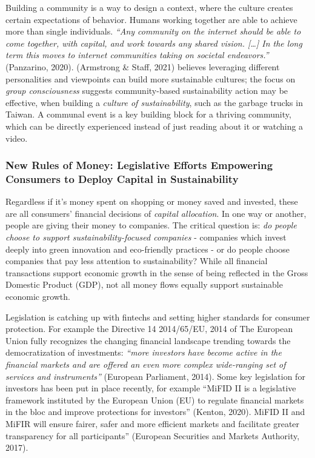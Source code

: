\documentclass[
  12pt,
  letterpaper,
  DIV=11,
  numbers=noendperiod]{scrartcl}
\begin{document}
Building a community is a way to design a context, where the culture
creates certain expectations of behavior. Humans working together are
able to achieve more than single individuals. \emph{``Any community on
the internet should be able to come together, with capital, and work
towards any shared vision. {[}\ldots{]} In the long term this moves to
internet communities taking on societal endeavors.''} (Panzarino, 2020).
(Armstrong \& Staff, 2021) believes leveraging different personalities
and viewpoints can build more sustainable cultures; the focus on
\emph{group consciousness} suggests community-based sustainability
action may be effective, when building a \emph{culture of
sustainability}, such as the garbage trucks in Taiwan. A communal event
is a key building block for a thriving community, which can be directly
experienced instead of just reading about it or watching a video.

\subsubsection{New Rules of Money: Legislative Efforts Empowering
Consumers to Deploy Capital in
Sustainability}\label{new-rules-of-money-legislative-efforts-empowering-consumers-to-deploy-capital-in-sustainability}

Regardless if it's money spent on shopping or money saved and invested,
these are all consumers' financial decisions of \emph{capital
allocation}. In one way or another, people are giving their money to
companies. The critical question is: \emph{do people choose to support
sustainability-focused companies} - companies which invest deeply into
green innovation and eco-friendly practices - or do people choose
companies that pay less attention to sustainability? While all financial
transactions support economic growth in the sense of being reflected in
the Gross Domestic Product (GDP), not all money flows equally support
sustainable economic growth.

Legislation is catching up with fintechs and setting higher standards
for consumer protection. For example the Directive 14 2014/65/EU, 2014
of The European Union fully recognizes the changing financial landscape
trending towards the democratization of investments: \emph{``more
investors have become active in the financial markets and are offered an
even more complex wide-ranging set of services and instruments''}
(European Parliament, 2014). Some key legislation for investors has been
put in place recently, for example ``MiFID II is a legislative framework
instituted by the European Union (EU) to regulate financial markets in
the bloc and improve protections for investors'' (Kenton, 2020). MiFID
II and MiFIR will ensure fairer, safer and more efficient markets and
facilitate greater transparency for all participants'' (European
Securities and Markets Authority, 2017).
\end{document}
